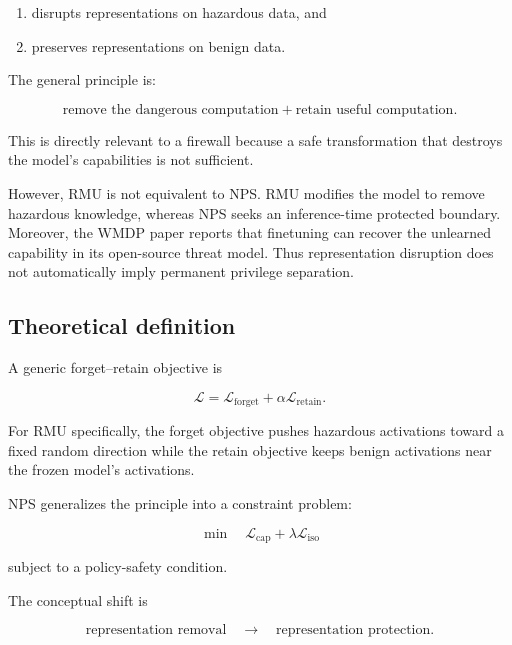 \documentclass[11pt]{article}
\begin{document}
\begin{enumerate}
    \item disrupts representations on hazardous data, and
    \item preserves representations on benign data.
\end{enumerate}

The general principle is:

\begin{equation}
\text{remove the dangerous computation}
+
\text{retain useful computation}.
\end{equation}

This is directly relevant to a firewall because a safe transformation that
destroys the model's capabilities is not sufficient.

However, RMU is not equivalent to NPS. RMU modifies the model to remove
hazardous knowledge, whereas NPS seeks an inference-time protected boundary.
Moreover, the WMDP paper reports that finetuning can recover the unlearned
capability in its open-source threat model. Thus representation disruption
does not automatically imply permanent privilege separation.

\subsection*{Theoretical definition}

A generic forget--retain objective is

\begin{equation}
\mathcal L
=
\mathcal L_{\mathrm{forget}}
+
\alpha
\mathcal L_{\mathrm{retain}}.
\end{equation}

For RMU specifically, the forget objective pushes hazardous activations
toward a fixed random direction while the retain objective keeps benign
activations near the frozen model's activations.

NPS generalizes the principle into a constraint problem:

\begin{equation}
\min
\quad
\mathcal L_{\mathrm{cap}}
+
\lambda\mathcal L_{\mathrm{iso}}
\end{equation}

subject to a policy-safety condition.

The conceptual shift is

\begin{equation}
\boxed{
\text{representation removal}
\quad\rightarrow\quad
\text{representation protection}.
}
\end{equation}
\end{document}
